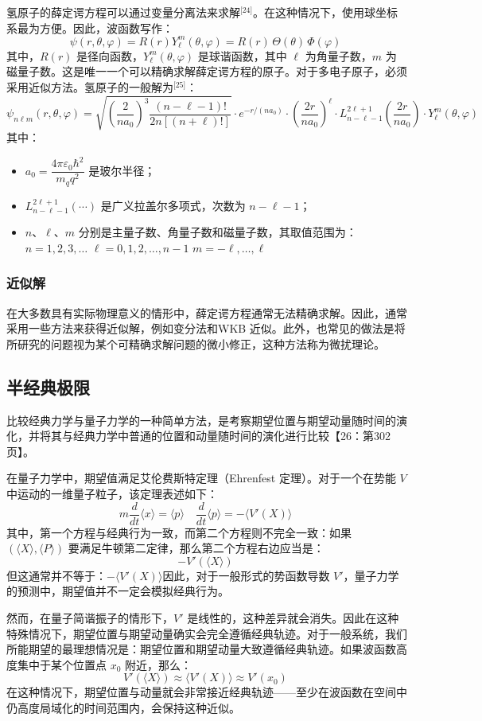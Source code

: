 氢原子的薛定谔方程可以通过变量分离法来求解\(^\text{[24]}\)。在这种情况下，使用球坐标系最为方便。因此，波函数写作：
$$
\psi(r, \theta, \varphi) = R(r) Y_{\ell}^{m}(\theta, \varphi) = R(r)\, \Theta(\theta)\, \Phi(\varphi)~
$$
其中，$R(r)$ 是径向函数，$Y_{\ell}^{m}(\theta, \varphi)$ 是球谐函数，其中 $\ell$ 为角量子数，$m$ 为磁量子数。这是唯一一个可以精确求解薛定谔方程的原子。对于多电子原子，必须采用近似方法。氢原子的一般解为\(^\text{[25]}\)：
$$
\psi_{n\ell m}(r,\theta,\varphi) = \sqrt{\left( \frac{2}{n a_0} \right)^3 \frac{(n - \ell - 1)!}{2n[(n + \ell)!]}} \cdot e^{-r / (n a_0)} \cdot \left( \frac{2r}{n a_0} \right)^\ell \cdot L_{n - \ell - 1}^{2\ell + 1} \left( \frac{2r}{n a_0} \right) \cdot Y_\ell^m(\theta, \varphi)~
$$
其中：
\begin{itemize}
\item $a_0 = \dfrac{4\pi \varepsilon_0 \hbar^2}{m_q q^2}$ 是玻尔半径；
\item $L_{n - \ell - 1}^{2\ell + 1}(\cdots)$ 是广义拉盖尔多项式，次数为 $n - \ell - 1$；
\item $n$、$\ell$、$m$ 分别是主量子数、角量子数和磁量子数，其取值范围为：$n = 1, 2, 3, \dots$ $\ell = 0, 1, 2, \dots, n - 1$ $m = -\ell, \dots, \ell$
\end{itemize}
\subsubsection{近似解}
在大多数具有实际物理意义的情形中，薛定谔方程通常无法精确求解。因此，通常采用一些方法来获得近似解，例如变分法和WKB 近似。此外，也常见的做法是将所研究的问题视为某个可精确求解问题的微小修正，这种方法称为微扰理论。
\subsection{半经典极限}
比较经典力学与量子力学的一种简单方法，是考察期望位置与期望动量随时间的演化，并将其与经典力学中普通的位置和动量随时间的演化进行比较【26：第302页】。

在量子力学中，期望值满足艾伦费斯特定理（Ehrenfest 定理）。对于一个在势能 $V$ 中运动的一维量子粒子，该定理表述如下：
$$
m \frac{d}{dt} \langle x \rangle = \langle p \rangle \quad \frac{d}{dt} \langle p \rangle = -\langle V'(X) \rangle~
$$
其中，第一个方程与经典行为一致，而第二个方程则不完全一致：如果 $(\langle X \rangle, \langle P \rangle)$ 要满足牛顿第二定律，那么第二个方程右边应当是：
$$
- V'\left( \langle X \rangle \right)~
$$
但这通常并不等于：$- \langle V'(X) \rangle$因此，对于一般形式的势函数导数 $V'$，量子力学的预测中，期望值并不一定会模拟经典行为。

然而，在量子简谐振子的情形下，$V'$ 是线性的，这种差异就会消失。因此在这种特殊情况下，期望位置与期望动量确实会完全遵循经典轨迹。对于一般系统，我们所能期望的最理想情况是：期望位置和期望动量大致遵循经典轨迹。如果波函数高度集中于某个位置点 $x_0$ 附近，那么：
$$
V'\left( \langle X \rangle \right) \approx \langle V'(X) \rangle \approx V'(x_0)~
$$
在这种情况下，期望位置与动量就会非常接近经典轨迹——至少在波函数在空间中仍高度局域化的时间范围内，会保持这种近似。
